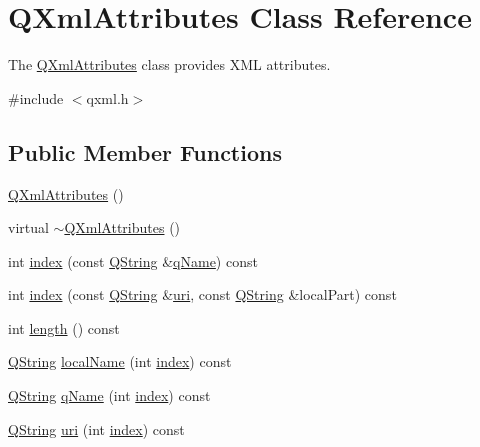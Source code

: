 \hypertarget{class_q_xml_attributes}{}\section{Q\+Xml\+Attributes Class Reference}
\label{class_q_xml_attributes}


The \mbox{\hyperlink{class_q_xml_attributes}{Q\+Xml\+Attributes}} class provides X\+ML attributes.  




{\ttfamily \#include $<$qxml.\+h$>$}

\subsection*{Public Member Functions}
\begin{DoxyCompactItemize}
\item 
\mbox{\hyperlink{class_q_xml_attributes_a074730261cfe3a0f4292cbda7854892b}{Q\+Xml\+Attributes}} ()
\item 
virtual \mbox{\hyperlink{class_q_xml_attributes_a2d482c168ff403041fc1dd2fc8044a7b}{$\sim$\+Q\+Xml\+Attributes}} ()
\item 
int \mbox{\hyperlink{class_q_xml_attributes_a5d219582743f952156f1bf66fe843ea4}{index}} (const \mbox{\hyperlink{class_q_string}{Q\+String}} \&\mbox{\hyperlink{class_q_xml_attributes_a1dadc4d5470c544f9826f438d9aa3321}{q\+Name}}) const
\item 
int \mbox{\hyperlink{class_q_xml_attributes_a4aadf1fb97f9c69f9b9c4079d7c9b630}{index}} (const \mbox{\hyperlink{class_q_string}{Q\+String}} \&\mbox{\hyperlink{class_q_xml_attributes_aff9c3f007752e367a6ccc83fb3537496}{uri}}, const \mbox{\hyperlink{class_q_string}{Q\+String}} \&local\+Part) const
\item 
int \mbox{\hyperlink{class_q_xml_attributes_aa36145f8c505f42637cf0afbf9862918}{length}} () const
\item 
\mbox{\hyperlink{class_q_string}{Q\+String}} \mbox{\hyperlink{class_q_xml_attributes_aac2045c7130627fffb30ae132d3e44ac}{local\+Name}} (int \mbox{\hyperlink{class_q_xml_attributes_a5d219582743f952156f1bf66fe843ea4}{index}}) const
\item 
\mbox{\hyperlink{class_q_string}{Q\+String}} \mbox{\hyperlink{class_q_xml_attributes_a1dadc4d5470c544f9826f438d9aa3321}{q\+Name}} (int \mbox{\hyperlink{class_q_xml_attributes_a5d219582743f952156f1bf66fe843ea4}{index}}) const
\item 
\mbox{\hyperlink{class_q_string}{Q\+String}} \mbox{\hyperlink{class_q_xml_attributes_aff9c3f007752e367a6ccc83fb3537496}{uri}} (int \mbox{\hyperlink{class_q_xml_attributes_a5d219582743f952156f1bf66fe843ea4}{index}}) const

\end{DoxyCompactItemize}

